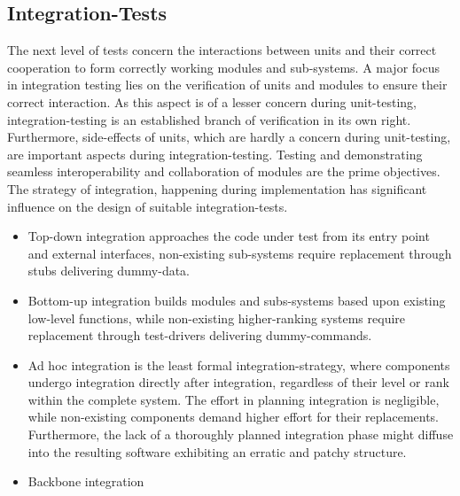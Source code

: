 \documentclass[master,english,smartquotes,apa]{hgbthesis}
\begin{document}
			\subsection{Integration-Tests}
			The next level of tests concern the interactions between units and their correct cooperation to form correctly working modules and sub-systems. A major focus in integration testing lies on the verification of units and modules to ensure their correct interaction. As this aspect is of a lesser concern during unit-testing, integration-testing is an established branch of verification in its own right. Furthermore, side-effects of units, which are hardly a concern during unit-testing, are important aspects during integration-testing. Testing and demonstrating seamless interoperability and collaboration of modules are the prime objectives. \cite{SpilSoft2005} %
			The strategy of integration, happening during implementation has significant influence on the design of suitable integration-tests. 
			\begin{itemize} \setlength\itemsep{1px}
			\item Top-down integration approaches the code under test from its entry point and external interfaces, non-existing sub-systems require replacement through stubs delivering dummy-data.
			\item Bottom-up integration builds modules and subs-systems based upon existing low-level functions, while non-existing higher-ranking systems require replacement through test-drivers delivering dummy-commands.
			\item Ad hoc integration is the least formal integration-strategy, where components undergo integration directly after integration, regardless of their level or rank within the complete system. The effort in planning integration is negligible, while non-existing components demand higher effort for their replacements. Furthermore, the lack of a thoroughly planned integration phase might diffuse into the resulting software exhibiting an erratic and patchy structure.
			\item Backbone integration \cite{Beizer90}
			\end{itemize} 
			
\end{document}
